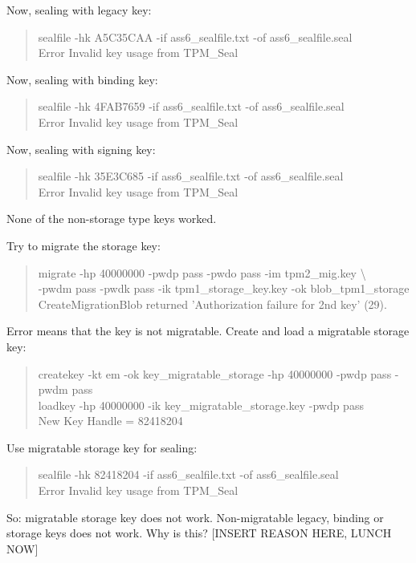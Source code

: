 \documentclass[10pt]{article}
\begin{document}
Now, sealing with legacy key:
\begin{quote}
sealfile -hk A5C35CAA -if ass6\_sealfile.txt -of ass6\_sealfile.seal \\
Error Invalid key usage from TPM\_Seal
\end{quote}

Now, sealing with binding key:
\begin{quote}
sealfile -hk 4FAB7659 -if ass6\_sealfile.txt -of ass6\_sealfile.seal\\
Error Invalid key usage from TPM\_Seal
\end{quote}

Now, sealing with signing key:
\begin{quote}
sealfile -hk 35E3C685 -if ass6\_sealfile.txt -of ass6\_sealfile.seal \\
Error Invalid key usage from TPM\_Seal
\end{quote}

None of the non-storage type keys worked. 

Try to migrate the storage key:
\begin{quote}
migrate -hp 40000000 -pwdp pass -pwdo pass -im tpm2\_mig.key \textbackslash \\
-pwdm pass -pwdk pass -ik tpm1\_storage\_key.key -ok blob\_tpm1\_storage \\
CreateMigrationBlob returned 'Authorization failure for 2nd key' (29).
\end{quote}

Error means that the key is not migratable. 
Create and load a migratable storage key:
\begin{quote}
createkey -kt em -ok key\_migratable\_storage -hp 40000000 -pwdp pass -pwdm pass \\
loadkey -hp 40000000 -ik key\_migratable\_storage.key -pwdp pass \\
New Key Handle = 82418204
\end{quote}

Use migratable storage key for sealing:
\begin{quote}
sealfile -hk 82418204 -if ass6\_sealfile.txt -of ass6\_sealfile.seal \\
Error Invalid key usage from TPM\_Seal
\end{quote}

So: migratable storage key does not work. Non-migratable legacy, binding or 
storage keys does not work. Why is this? [INSERT REASON HERE, LUNCH NOW]

\begin{quote}
\end{quote}
\end{document}
